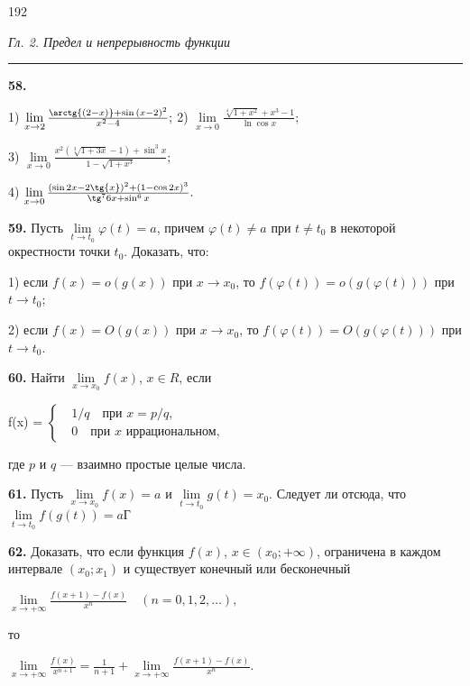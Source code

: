 \documentclass[11pt, a4paper]{article}
\begin{document}
	\Large
	
	192 
	\vspace*{-31pt}
	\begin{center}
		\textit{Гл. 2. Предел и непрерывность функции}\
	\end{center}
	\vspace*{-25pt}
	\noindent \rule{\textwidth}{0.5pt}

	\textbf{58.} 
	
	1) $\lim\limits_{{x \to 2}} \frac{\arctg{(2 - x)} + \sin{(x - 2)^2}}{x^2 - 4};$ 
	\hspace{0.1cm}
	2) $\lim\limits_{x \to 0} \frac{\sqrt[4]{1 + x^2} + x^3 - 1}{\ln{\cos{x}}};$
	
	3) $\lim\limits_{x \to 0} \frac{x^2(\sqrt[3]{1+3x}-1) + \sin^3{x}}{1-\sqrt{1+x^3}};$
	
	4) $\lim\limits_{x \to 0} \frac{(\sin{2x} - 2\tg{x})^2 + (1-\cos{2x})^3}{\tg^{7}{6x}+\sin^{6}{x}}.$
	
	\textbf{59.} Пусть $\lim\limits_{{t \to t_0}} \varphi(t) = a$, причем $\varphi(t) \neq a$ при $t \neq t_0$ в некоторой окрестности точки $t_0$. Доказать, что:
	
	1) если $f(x) = o(g(x))$ при $x \to x_0$, то $f(\varphi(t)) = o(g(\varphi(t)))$ при $t \to t_0$;
	
	2) если $f(x) = O(g(x))$ при $x \to x_0$, то $f(\varphi(t)) = O(g(\varphi(t)))$ при $t \to t_0$.
	
	\textbf{60.} Найти $\lim\limits_{{x \to x_0}} f(x)$, $x \in R$, если
	 
	\begin{center}
		f(x) =
		$\begin{cases} 
			\text{ } 1/q \quad \text{при } x = p/q, \\
			\text{ } 0 \quad \text{при } x \text{ иррациональном},
		\end{cases}$
	\end{center}
	
	где $p$ и $q$ — взаимно простые целые числа.
	
	\textbf{61.} Пусть $\lim\limits_{{x \to x_0}} f(x) = a$ и $\lim\limits_{{t\to t_0}}g(t) = x_0$. Следует ли отсюда, что 
	\\$\lim\limits_{{t\to t_0}} f(g(t)) = a\text{Г}$
	
	\textbf{62.} Доказать, что если функция  $f(x)$, $x \in (x_0; +\infty)$, ограничена в каждом интервале  $(x_0; x_1)$ и существует конечный или бесконечный
	\begin{center}
		$\lim\limits_{{x \to +\infty}} \frac{f(x+1)-f(x)}{x^n} \quad (n=0,1,2,\dots),$
	\end{center}
	то
	\begin{center}
		$\lim\limits_{{x \to +\infty}} \frac{f(x)}{x^{n+1}} = \frac{1}{n+1}+\lim\limits_{{x \to +\infty}}\frac{f(x+1)-f(x)}{x^n}$.
	\end{center}
	
\end{document}
